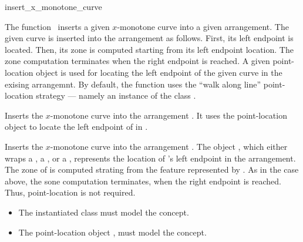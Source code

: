 \ccRefPageBegin

\begin{ccRefFunction}{insert_x_monotone_curve}

\ccDefinition

The function \ccRefName\ inserts a given $x$-monotone curve into a
given arrangement. The given curve is inserted into the arrangement as
follows. First, its left endpoint is located. Then, its zone is computed
starting from its left endpoint location. The zone computation terminates
when the right endpoint is reached. A given point-location object is used
for locating the left endpoint of the given curve in the exising
arrangemnt. By default, the function uses the ``walk along line''
point-location strategy --- namely an instance of the class
.


Inserts the $x$-monotone curve  into the arrangement . It
uses the point-location object  to locate the left endpoint of
 in .


Inserts the $x$-monotone curve  into the arrangement . 
The object , which either wraps a , a
, or a , represents the
location of 's left endpoint in the arrangement. The zone of
 is computed strating from the feature represented by .
As in the case above, the sone computation terminates, when the right
endpoint is reached.  Thus, point-location is not required.

\ccRequirements
\begin{itemize}
\item The instantiated  class must model the
   concept.
\item The point-location object , must model the
   concept.
\end{itemize}
			 
\end{ccRefFunction}

\ccRefPageEnd
